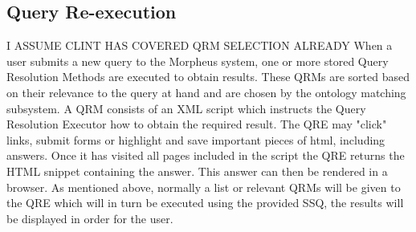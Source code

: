 \subsection{Query Re-execution}
	I ASSUME CLINT HAS COVERED QRM SELECTION ALREADY
	When a user submits a new query to the Morpheus system, one or more stored 
Query Resolution Methods are executed to obtain results. These QRMs are sorted based
on their relevance to the query at hand and are chosen by the ontology matching subsystem.
	A QRM consists of an XML script which instructs the Query Resolution Executor how to 
obtain the required result. The QRE may "click" links, submit forms or highlight and save
important pieces of html, including answers. Once it has visited all pages included in the 
script the QRE returns the HTML snippet containing the answer. This answer can then be
rendered in a browser. As mentioned above, normally a list or relevant QRMs will be given
to the QRE which will in turn be executed using the provided SSQ, the results will be 
displayed in order for the user. 